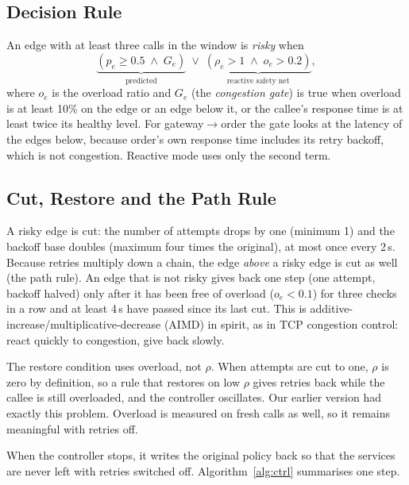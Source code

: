 \documentclass[conference,a4paper]{IEEEtran}
\begin{document}
\subsection{Decision Rule}
An edge with at least three calls in the window is \emph{risky} when
\begin{equation}
\underbrace{(p_e \ge 0.5 \;\wedge\; G_e)}_{\text{predicted}} \;\vee\; \underbrace{(\rho_e > 1 \;\wedge\; o_e > 0.2)}_{\text{reactive safety net}},
\label{eq:risky}
\end{equation}
where $o_e$ is the overload ratio and $G_e$ (the \emph{congestion gate}) is true when overload is at least 10\% on the edge or an edge below it, or the callee's response time is at least twice its healthy level. For gateway$\to$order the gate looks at the latency of the edges below, because order's own response time includes its retry backoff, which is not congestion. Reactive mode uses only the second term.

\subsection{Cut, Restore and the Path Rule}
A risky edge is cut: the number of attempts drops by one (minimum 1) and the backoff base doubles (maximum four times the original), at most once every 2\,s. Because retries multiply down a chain, the edge \emph{above} a risky edge is cut as well (the path rule). An edge that is not risky gives back one step (one attempt, backoff halved) only after it has been free of overload ($o_e < 0.1$) for three checks in a row and at least 4\,s have passed since its last cut. This is additive-increase/multiplicative-decrease (AIMD) in spirit, as in TCP congestion control: react quickly to congestion, give back slowly.

The restore condition uses overload, not $\rho$. When attempts are cut to one, $\rho$ is zero by definition, so a rule that restores on low $\rho$ gives retries back while the callee is still overloaded, and the controller oscillates. Our earlier version had exactly this problem. Overload is measured on fresh calls as well, so it remains meaningful with retries off.

When the controller stops, it writes the original policy back so that the services are never left with retries switched off. Algorithm~\ref{alg:ctrl} summarises one step.
\end{document}
